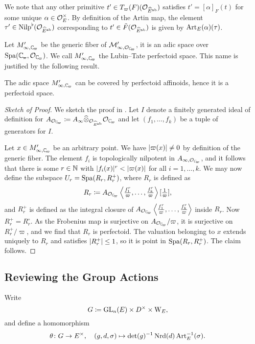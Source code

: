 \documentclass[../main.tex]{subfiles}
\begin{document}
We note that any other primitive $t' \in T_\varpi(F)(\mathcal{O}_{\widehat E^{\mathrm{ab}}})$ satisfies
$t' = [\alpha]_F(t)$ for some unique $\alpha \in \mathcal{O}_E^\times$. 
By definition of the Artin map, the element $\tau' \in {\mathrm{Nilp}}^\flat(\mathcal{O}_{\widehat
E^{\mathrm{ab}}})$ corresponding to $t' \in \tilde F(\mathcal{O}_{\widehat E^{\mathrm{ab}}})$ is given by
$\operatorname{Art}_E(\alpha)(\tau)$.

Let $M'_{\infty, \Cp}$ be the generic fiber of $\cM'_{\infty,\cO_\Cp}$, it 
is an adic space over $\spa(\Cp, \cO_\Cp)$. We call $M'_{\infty, \Cp}$ the 
Lubin--Tate perfectoid space. This name is justified by the following result.
\begin{thm}\label{thm:LTPerfSpace}
  The adic space $M'_{\infty, \Cp}$ can be covered by perfectoid affinoids,
  hence it is a perfectoid space.
  \begin{proof}[Sketch of Proof] 
    We sketch the proof in \cite[Lemma 2.32]{weinstein2016semistable}. 
    Let $I$ denote a finitely generated ideal of definition for $A_{\cO_\Cp}
    \coloneqq A_\infty \cotimes_{\cO_{\hat E^\ab}} \cO_\Cp$ and let $(f_1,
    \dots, f_k)$ be a tuple of generators for $I$. 

    Let $x \in M'_{\infty, \Cp}$ be an arbitrary point. We have
    $\lvert \varpi(x) \rvert \neq 0$ by definition of the generic fiber. The element
    $f_i$ is topologically nilpotent in $A_{\infty,\cO_\Cp}$,
    and it follows that there is some $r \in \mathbb{N}$ with $\lvert f_i(x) \rvert^r <
    \lvert \varpi(x) \rvert$ for all $i = 1, \dots, k$. We may now define the subspace 
    $U_r = \operatorname{Spa}(R_r, R_r^+)$, where $R_r$ is defined as
    $$R_r \coloneqq A_{\cO_\Cp}\left\langle \tfrac{f_1^r}\varpi, \dots, \tfrac
    {f_k^r}\varpi \right\rangle [\tfrac 1\varpi],$$
    and $R_r^+$ is defined as the integral closure of $A_{\cO_\Cp}\left\langle
    \tfrac{f_1^r}\varpi, \dots, \tfrac {f_k^r}\varpi \right\rangle$ inside
    $R_r$. Now $R_r^+ = R_r^\circ$. As the Frobenius map is surjective on
    $A_{\cO_\Cp}/\varpi$, it is surjective on $R_r^+/\varpi$, and we find
    that $R_r$ is perfectoid. The valuation
    belonging to $x$ extends uniquely to $R_r$ and satisfies $\lvert R_r^+ \rvert \leq 1$,
    so it is point in $\operatorname{Spa}(R_r, R_r^+)$. The claim follows.
  \end{proof}
\end{thm}


\subsection{Reviewing the Group Actions} %
\label{ssub:Group Actions on the Universal Cover}
Write
\begin{equation*}
  G \coloneqq \operatorname{GL}_n(E) \times D^\times \times \mathrm W_E,
\end{equation*}
and define a homomorphism
\begin{equation*}
  \theta \colon G \to E^\times, \quad (g,d,\sigma) \mapsto \det(g)^{-1} \operatorname{Nrd}(d)
  \operatorname{Art}^{-1}_E(\sigma).
\end{equation*}
\end{document}

